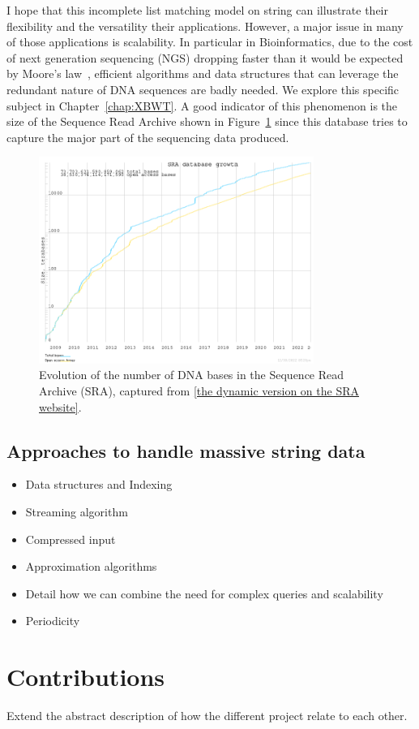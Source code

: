 I hope that this incomplete list matching model on string can illustrate their flexibility and the versatility their applications. However, a major issue in many of those applications is scalability. In particular in Bioinformatics, due to the cost of next generation sequencing (NGS) dropping faster than it would be expected by Moore's law~\cite{muir2016real}, efficient algorithms and data structures that can leverage the redundant nature of DNA sequences are badly needed. We explore this specific subject in Chapter~\ref{chap:XBWT}. A good indicator of this phenomenon is the size of the Sequence Read Archive shown in Figure~\ref{fig:intro:sra} since this database tries to capture the major part of the sequencing data produced.

\begin{figure}
    \begin{center}
        \includegraphics[width=0.8\textwidth]{Introduction/sra_database_growth.png}
        \caption{Evolution of the number of DNA bases in the Sequence Read Archive (SRA), captured from \href{https://www.ncbi.nlm.nih.gov/sra/docs/sragrowth/}{[the dynamic version on the SRA website]}.}
        \label{fig:intro:sra}
    \end{center}
\end{figure}


\subsection*{Approaches to handle massive string data}

\begin{itemize}
\item Data structures and Indexing
\item Streaming algorithm
\item Compressed input
\item Approximation algorithms
\end{itemize}

\begin{itemize}
    \item Detail how we can combine the need for complex queries and scalability
    \item Periodicity
\end{itemize}

\section*{Contributions}

Extend the abstract description of how the different project relate to each other.
